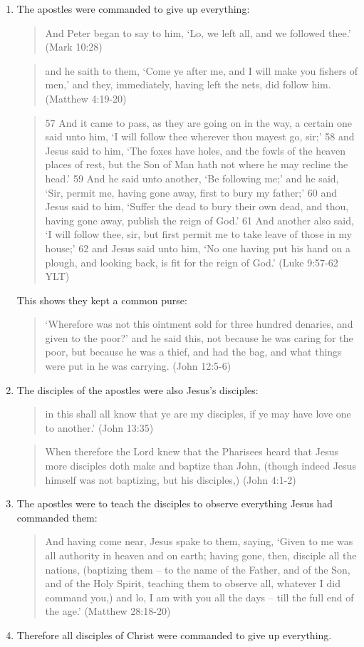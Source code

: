 \documentclass[11pt]{article}
\begin{document}
\begin{enumerate}
\item The apostles were commanded to give up everything:
\begin{quote}
And Peter began to say to him, `Lo, we left all, and we followed thee.' 
(Mark 10:28)
\end{quote}
\begin{quote}
and he saith to them, `Come ye after me, and I will make you fishers of men,' and they, immediately, having left the nets, did follow him.
(Matthew 4:19-20)
\end{quote}
\begin{quote}
57 And it came to pass, as they are going on in the way, a certain one
said unto him, ‘I will follow thee wherever thou mayest go, sir;’ 58 and Jesus said to him, ‘The foxes have holes, and the fowls of the heaven places of rest, but the Son of Man hath not where he may recline the head.’ 59 And he said unto another, ‘Be following me;’ and he said, ‘Sir, permit me, having gone away, first to bury my father;’ 60 and Jesus said to him, ‘Suffer the dead to bury their own dead, and thou, having gone away, publish the reign of God.’ 61 And another also said, ‘I will follow thee, sir, but first permit me to take leave of those in my house;’ 62 and Jesus said unto him, ‘No one having put his hand on a plough, and looking back, is fit for the reign of God.’ (Luke 9:57-62 YLT)
\end{quote}
This shows they kept a common purse:
\begin{quote}
`Wherefore was not this ointment sold for three hundred denaries, and given to the poor?' and he said this, not because he was caring for the poor, but because he was a thief, and had the bag, and what things were put in he was carrying. (John 12:5-6) 
\end{quote}
\item The disciples of the apostles were also Jesus's disciples:
\begin{quote}
in this shall all know that ye are my disciples, if ye may have love one to another.' (John 13:35) 
\end{quote}
\begin{quote}
When therefore the Lord knew that the Pharisees heard that Jesus more disciples doth make and baptize than John, (though indeed Jesus himself was not baptizing, but his disciples,) (John 4:1-2) 
\end{quote}
\item The apostles were to teach the disciples to observe everything Jesus had commanded them: 
\begin{quote}
And having come near, Jesus spake to them, saying, `Given to me was all authority in heaven and on earth;
having gone, then, disciple all the nations, (baptizing them -- to the name of the Father, and of the Son, and of the Holy Spirit,
teaching them to observe all, whatever I did command you,) and lo, I am with you all the days -- till the full end of the age.' (Matthew 28:18-20)
\end{quote}
\item Therefore all disciples of Christ were commanded to give up everything.\newline 
\end{enumerate}
\end{document}
